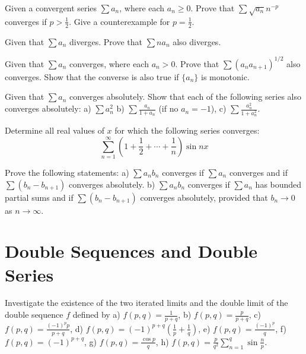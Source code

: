 \begin{problembox}
Given a convergent series \(\sum a_n\), where each \(a_n \geq 0\). Prove that \(\sum \sqrt{a_n} n^{-p}\) converges if \(p > \frac{1}{2}\). Give a counterexample for \(p = \frac{1}{2}\).
\end{problembox}

\begin{problembox}
Given that \(\sum a_n\) diverges. Prove that \(\sum n a_n\) also diverges.
\end{problembox}

\begin{problembox}
Given that \(\sum a_n\) converges, where each \(a_n > 0\). Prove that \(\sum (a_n a_{n+1})^{1/2}\) also converges. Show that the converse is also true if \(\{a_n\}\) is monotonic.
\end{problembox}

\begin{problembox}
Given that \(\sum a_n\) converges absolutely. Show that each of the following series also converges absolutely:
a) \(\sum a_n^2\) b) \(\sum \frac{a_n}{1 + a_n}\) (if no \(a_n = -1\)),
c) \(\sum \frac{a_n^2}{1 + a_n^2}\).
\end{problembox}

\begin{problembox}
Determine all real values of \(x\) for which the following series converges:
\[\sum_{n=1}^{\infty} \left( 1 + \frac{1}{2} + \cdots + \frac{1}{n} \right) \sin nx\]
\end{problembox}

\begin{problembox}
Prove the following statements:
a) \(\sum a_n b_n\) converges if \(\sum a_n\) converges and if \(\sum (b_n - b_{n+1})\) converges absolutely.
b) \(\sum a_n b_n\) converges if \(\sum a_n\) has bounded partial sums and if \(\sum (b_n - b_{n+1})\) converges absolutely, provided that \(b_n \to 0\) as \(n \to \infty\).
\end{problembox}

\section{Double Sequences and Double Series}

\begin{problembox}
Investigate the existence of the two iterated limits and the double limit of the double sequence \(f\) defined by
a) \( f(p, q) = \frac{1}{p + q}\), b) \( f(p, q) = \frac{p}{p + q}\),
c) \( f(p, q) = \frac{(-1)^p p}{p + q}\), d) \( f(p, q) = (-1)^{p+q} \left( \frac{1}{p} + \frac{1}{q} \right)\),
e) \( f(p, q) = \frac{(-1)^p}{q}\), f) \( f(p, q) = (-1)^{p+q}\),
g) \( f(p, q) = \frac{\cos p}{q}\), h) \( f(p, q) = \frac{p}{q^2} \sum_{n=1}^{q} \sin \frac{n}{p}\).
\end{problembox}


